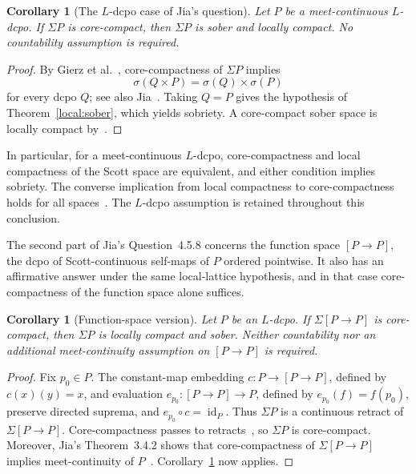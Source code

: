 \documentclass[10pt,a4paper]{article}
\newtheorem{corollary}[theorem]{Corollary}
\theoremstyle{definition}
\begin{document}
\begin{corollary}[The $L$-dcpo case of Jia's question]\label{local:corecompact}
Let $P$ be a meet-continuous $L$-dcpo. If $\Sigma P$ is core-compact, then $\Sigma P$ is sober and locally compact. No countability assumption is required.
\end{corollary}
\begin{proof}
By Gierz et al.~\cite[Theorem~II-4.13]{GHK}, core-compactness of $\Sigma P$ implies
\[
 \sigma(Q\times P)=\sigma(Q)\times\sigma(P)
\]
for every dcpo $Q$; see also Jia~\cite[Theorem~2.5.7]{Jia}. Taking $Q=P$ gives the hypothesis of Theorem~\ref{local:sober}, which yields sobriety. A core-compact sober space is locally compact by~\cite[Theorem~V-5.6]{GHK}.
\end{proof}

In particular, for a meet-continuous $L$-dcpo, core-compactness and local compactness of the Scott space are equivalent, and either condition implies sobriety. The converse implication from local compactness to core-compactness holds for all spaces~\cite[Examples~I-1.7(5)]{GHK}. The $L$-dcpo assumption is retained throughout this conclusion.

The second part of Jia's Question~4.5.8 concerns the function space $[P\to P]$, the dcpo of Scott-continuous self-maps of $P$ ordered pointwise. It also has an affirmative answer under the same local-lattice hypothesis, and in that case core-compactness of the function space alone suffices.

\begin{corollary}[Function-space version]\label{local:functionspace}
Let $P$ be an $L$-dcpo. If $\Sigma[P\to P]$ is core-compact, then $\Sigma P$ is locally compact and sober. Neither countability nor an additional meet-continuity assumption on $[P\to P]$ is required.
\end{corollary}
\begin{proof}
Fix $p_0\in P$. The constant-map embedding $c:P\to[P\to P]$, defined by $c(x)(y)=x$, and evaluation $e_{p_0}:[P\to P]\to P$, defined by $e_{p_0}(f)=f(p_0)$, preserve directed suprema, and $e_{p_0}\circ c=\operatorname{id}_P$. Thus $\Sigma P$ is a continuous retract of $\Sigma[P\to P]$. Core-compactness passes to retracts~\cite[Proposition~2.7.9]{Jia}, so $\Sigma P$ is core-compact. Moreover, Jia's Theorem~3.4.2 shows that core-compactness of $\Sigma[P\to P]$ implies meet-continuity of $P$~\cite{Jia}. Corollary~\ref{local:corecompact} now applies.
\end{proof}
\end{document}
